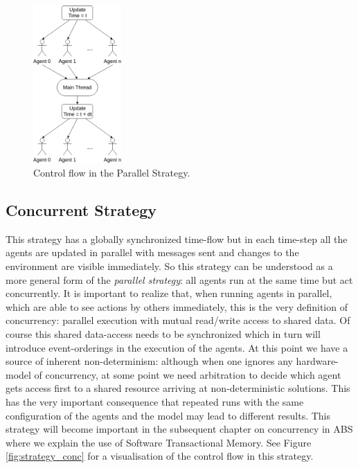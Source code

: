 \begin{figure}[H]
	\centering
	\includegraphics[width=0.3\textwidth, angle=0]{./fig/implabs/parallel.png}
	\caption{Control flow in the Parallel Strategy.}
	\label{fig:strategy_par}
\end{figure}

\subsection{Concurrent Strategy}
This strategy has a globally synchronized time-flow but in each time-step all the agents are updated in parallel with messages sent and changes to the environment are visible immediately. So this strategy can be understood as a more general form of the \textit{parallel strategy}: all agents run at the same time but act concurrently. It is important to realize that, when running agents in parallel, which are able to see actions by others immediately, this is the very definition of concurrency: parallel execution with mutual read/write access to shared data. Of course this shared data-access needs to be synchronized which in turn will introduce event-orderings in the execution of the agents. At this point we have a source of inherent non-determinism: although when one ignores any hardware-model of concurrency, at some point we need arbitration to decide which agent gets access first to a shared resource arriving at non-deterministic solutions. This has the very important consequence that repeated runs with the same configuration of the agents and the model may lead to different results. This strategy will become important in the subsequent chapter on concurrency in ABS where we explain the use of Software Transactional Memory. See Figure \ref{fig:strategy_conc} for a visualisation of the control flow in this strategy.

